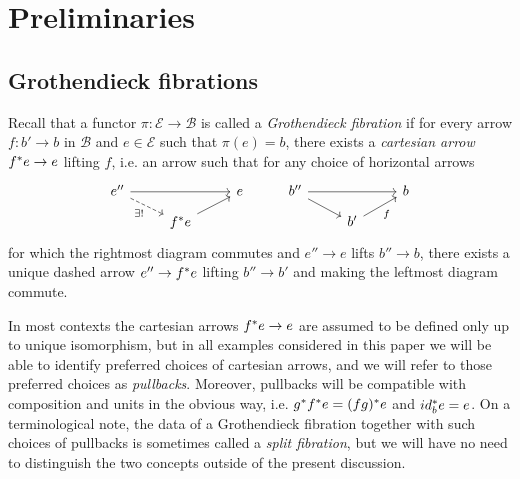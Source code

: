\documentclass[a4paper,10pt]{article}%
\begin{document}


\section{Preliminaries}
\label{PRELIM_SECTION}


\subsection{Grothendieck fibrations}\label{GROTHFIB REF}
Recall that a functor 
$\pi \colon \mathcal{E} \to \mathcal{B}$
is called a \textit{Grothendieck fibration} \cite[\S 8.1]{Bo94}
if for every arrow 
$f \colon b' \to b$ in $\mathcal{B}$
and $e \in \mathcal{E}$ such that $\pi(e)=b$,
there exists a \emph{cartesian arrow} 
$f^{\**} e \to e$ lifting $f$,
i.e. an arrow such that for any choice of horizontal arrows 
\[
\begin{tikzcd}[row sep=7pt]
	e'' \ar{rr} \ar[dashed]{rd}[swap]{\exists !} & & 
	e
&
	b'' \ar{rr} \ar{rd} & & 
	b
\\
	& f^{\**} e \ar{ru} &
&
	& b' \ar{ru}[swap]{f} &
\end{tikzcd}
\]
for which the rightmost diagram commutes and 
$e'' \to e$ lifts $b'' \to b$,
there exists a unique dashed arrow
$e'' \to f^{\**} e$ lifting $b'' \to b'$ and making the leftmost diagram commute.

In most contexts the cartesian arrows $f^{\**} e \to e$ are assumed to be defined only up to unique isomorphism, 
but in all examples considered in this paper
we will be able to identify preferred choices of cartesian arrows, and we will refer to those preferred choices as \textit{pullbacks}.
Moreover, pullbacks will be compatible with composition and units in the obvious way, i.e. $g^{\**} f^{\**} e = (fg)^{\**}e$ and $id_b^{\**}e=e$.
On a terminological note, 
the data of a Grothendieck fibration together with 
such choices of pullbacks is sometimes called a 
\textit{split fibration}, but we will have no need to distinguish the two concepts outside
of the present discussion.
\end{document}
